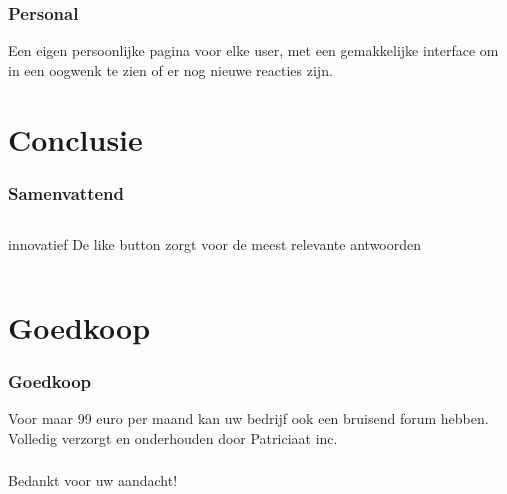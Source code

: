\documentclass{beamer}
\begin{document}
\begin{frame}
\frametitle{Personal}
Een eigen persoonlijke pagina voor elke user, met een gemakkelijke interface om in een oogwenk te zien of er nog nieuwe reacties zijn. 
\end{frame}



\section{Conclusie}

\begin{frame}
\frametitle{Samenvattend}
\begin{columns}
\begin{block}{innovatief}
De like button zorgt voor de meest relevante antwoorden 
\end{block}
\end{columns}
\end{frame}

\section{Goedkoop}

\begin{frame}
\frametitle{Goedkoop}
Voor maar 99 euro per maand kan uw bedrijf ook een bruisend forum hebben. \\
Volledig verzorgt en onderhouden door Patriciaat inc. 
\end{frame}

\begin{frame}
\frametitle{}
Bedankt voor uw aandacht!
\end{frame}


\end{document}
